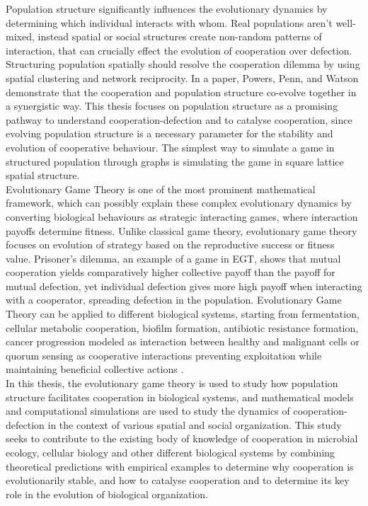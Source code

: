 \documentclass{article}
\begin{document}
Population structure significantly influences the evolutionary dynamics by determining which individual interacts with whom. Real populations aren't well-mixed, instead spatial or social structures create non-random patterns of interaction, that can crucially effect the evolution of cooperation over defection. Structuring population spatially should resolve the cooperation dilemma by using spatial clustering and network reciprocity\citep{Nowak2010}. 
In a paper, Powers, Penn, and Watson demonstrate that the cooperation and population structure co-evolve together in a synergistic way\citep{Powers2011}.
This thesis focuses on population structure as a promising pathway to understand cooperation-defection and to catalyse cooperation, since evolving population structure is a necessary parameter for the stability and evolution of cooperative behaviour. The simplest way to simulate a game in structured population through graphs is simulating the game in square lattice spatial structure.\\
Evolutionary Game Theory is one of the most prominent mathematical framework, which can possibly explain these complex evolutionary dynamics by converting biological behaviours as strategic interacting games, where interaction payoffs determine fitness. Unlike classical game theory, evolutionary game theory focuses on evolution of strategy based on the reproductive success or fitness value. Prisoner's dilemma, an example of a game in EGT, shows that mutual cooperation yields comparatively higher collective payoff than the payoff for mutual defection, yet individual defection gives more high payoff when interacting with a cooperator, spreading defection in the population.
Evolutionary Game Theory can be applied to different biological systems, starting from fermentation, cellular metabolic cooperation, biofilm formation, antibiotic resistance formation, cancer progression modeled as interaction between healthy and malignant cells or quorum sensing as cooperative interactions preventing exploitation while maintaining beneficial collective actions \citep{Hummert2014}.\\
In this thesis, the evolutionary game theory is used to study how population structure facilitates cooperation in biological systems, and mathematical models and computational simulations are used to study the dynamics of cooperation-defection in the context of various spatial and social organization. This study seeks to contribute to the existing body of knowledge of cooperation in microbial ecology, cellular biology and other different biological systems by combining theoretical predictions with empirical examples to determine why cooperation is evolutionarily stable, and how to catalyse cooperation and to determine its key role in the evolution of biological organization.
\end{document}
